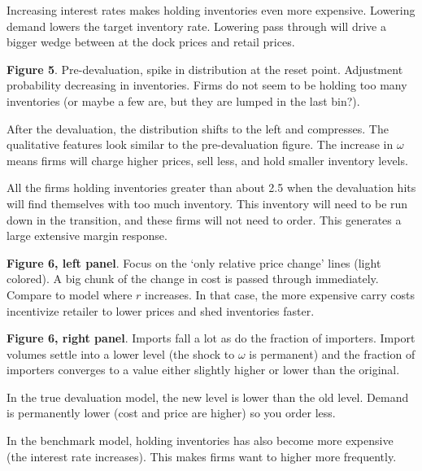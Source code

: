 \documentclass[11pt, pdftex]{article}
\begin{document}
Increasing interest rates makes holding inventories even more expensive. Lowering demand lowers the target inventory rate. Lowering pass through will drive a bigger wedge between at the dock prices and retail prices.

\textbf{Figure 5}. Pre-devaluation, spike in distribution at the reset point. Adjustment probability decreasing in inventories. Firms do not seem to be holding too many inventories (or maybe a few are, but they are lumped in the last bin?).

After the devaluation, the distribution shifts to the left and compresses. The qualitative features look similar to the pre-devaluation figure. The increase in $\omega$ means firms will charge higher prices, sell less, and hold smaller inventory levels.

All the firms holding inventories greater than about 2.5 when the devaluation hits will find themselves with too much inventory. This inventory will need to be run down in the transition, and these firms will not need to order. This generates a large extensive margin response.

\textbf{Figure 6, left panel}. Focus on the `only relative price change' lines (light colored). A big chunk of the change in cost is passed through immediately. Compare to model where $r$ increases. In that case, the more expensive carry costs incentivize retailer to lower prices and shed inventories faster.

\textbf{Figure 6, right panel}. Imports fall a lot as do the fraction of importers. Import volumes settle into a lower level (the shock to $\omega$ is permanent) and the fraction of importers converges to a value either slightly higher or lower than the original.

In the true devaluation model, the new level is lower than the old level. Demand is permanently lower (cost and price are higher) so you order less.

In the benchmark model, holding inventories has also become more expensive (the interest rate increases). This makes firms want to higher more frequently.

\setlength{\parskip}{0.0cm}
\printbibliography
\end{document}
